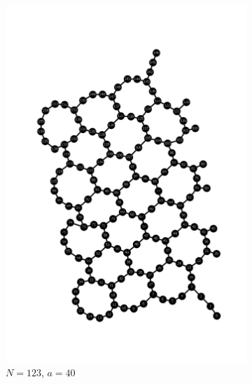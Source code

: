 \documentclass[conference,twoside]{IEEEtran}
\begin{document}
\begin{figure}[!htbp]
    \centering

    \begin{subfigure}{0.12\textwidth}
        \centering
        \includegraphics[width=\textwidth]{ibm_aachen_physical_circuit_layout_N123_a40_PT1_SO0.png}
        \caption{$N=123$, $a=40$}
    \end{subfigure}
    \hfill
    \begin{subfigure}{0.2\textwidth}
        \centering

\end{subfigure}
\end{figure}
\end{document}
